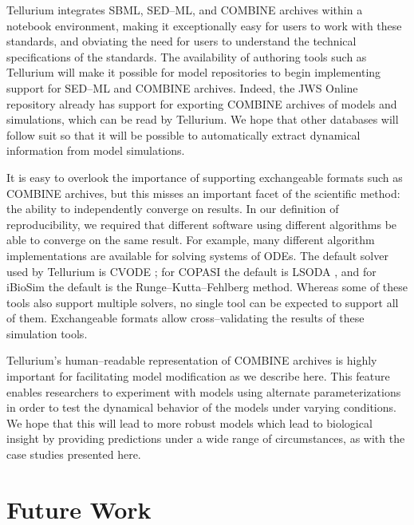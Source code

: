 \documentclass[10pt,letterpaper]{article}
\begin{document}
Tellurium integrates SBML, SED--ML, and COMBINE archives within a notebook environment, making it exceptionally easy for users to work with these standards, and obviating the need for users to understand the technical specifications of the standards. The availability of authoring tools such as Tellurium will make it possible for model repositories to begin implementing support for SED--ML and COMBINE archives. Indeed, the JWS Online repository \cite{olivier2004web} already has support for exporting COMBINE archives of models and simulations, which can be read by Tellurium. We hope that other databases will follow suit so that it will be possible to automatically extract dynamical information from model simulations.

It is easy to overlook the importance of supporting exchangeable formats such as COMBINE archives, but this misses an important facet of the scientific method: the ability to independently converge on results. In our definition of reproducibility, we required that different software using different algorithms be able to converge on the same result. For example, many different algorithm implementations are available for solving systems of ODEs. The default solver used by Tellurium is CVODE \cite{cohen1996cvode}; for COPASI the default is LSODA \cite{petzold1989computing}, and for iBioSim the default is the Runge–Kutta–Fehlberg method. Whereas some of these tools also support multiple solvers, no single tool can be expected to support all of them. Exchangeable formats allow cross--validating the results of these simulation tools.


Tellurium's human--readable representation of COMBINE archives is highly important for facilitating model modification as we describe here. This feature enables researchers to experiment with models using alternate parameterizations in order to test the dynamical behavior of the models under varying conditions. We hope that this will lead to more robust models which lead to biological insight by providing predictions under a wide range of circumstances, as with the case studies presented here.

\section*{Future Work}
\end{document}
